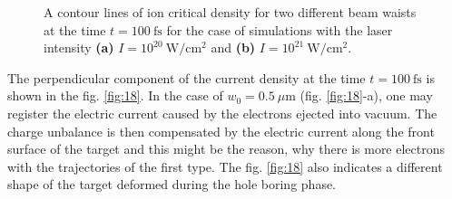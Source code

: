 \begin{figure}[h!]
	\centering
	\hspace{1mm}
	\caption{A contour lines of ion critical density for two different beam waists at the time $ t = 100 \ \mathrm{fs} $ for the case of simulations with the laser intensity \textbf{(a)} $ I = 10^{20} \ \mathrm{W/cm^2} $ and \textbf{(b)} $ I = 10^{21} \ \mathrm{W/cm^2} $.}
	\label{fig:15}
\end{figure}

The perpendicular component of the current density at the time $ t = 100 \ \mathrm{fs} $ is shown in the fig. \ref{fig:18}. In the case of $ w_0 = 0.5 \ \mu\mathrm{m} $ (fig. \ref{fig:18}-a), one may register the electric current caused by the electrons ejected into vacuum. The charge unbalance is then compensated by the electric current along the front surface of the target and this might be the reason, why there is more electrons with the trajectories of the first type. The fig. \ref{fig:18} also indicates a different shape of the target deformed during the hole boring phase.

